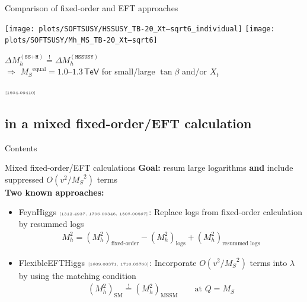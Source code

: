 \documentclass[hyperref={pdfpagelabels=false},ngerman]{beamer}
\newcommand{\eh}[1]{\,\mathsf{#1}}
\newcommand{\MS}{\ensuremath{M_S}}
\newcommand{\mycite}[1]{\ensuremath{\text{\textcolor{darkgray}{\tiny [#1]}}}}
\renewcommand{\emph}{\textbf}
\newcommand{\SM}{\ensuremath{\text{SM}}}
\newcommand{\MSSM}{\ensuremath{\text{MSSM}}}
\newcommand{\TeV}{\eh{TeV}}
\newcommand{\DMh}{\ensuremath{\Delta M_h^{(\texttt{SS+H})}}}
\newcommand{\DMhHSSUSY}{\ensuremath{\Delta M_h^{(\HSSUSY)}}}
\def\HSSUSY{\texttt{HSSUSY}}
\begin{document}
\begin{frame}{Comparison of fixed-order and EFT approaches}
  \begin{center}
    \texttt{[image: plots/SOFTSUSY/HSSUSY\_TB-20\_Xt--sqrt6\_individual]}\hfill
    \texttt{[image: plots/SOFTSUSY/Mh\_MS\_TB-20\_Xt--sqrt6]}
  \end{center}
  \begin{center}
    $\DMh \overset{!}{=} \DMhHSSUSY$\\[0.5em]
    $\Rightarrow$ $\MS^{\text{equal}} = 1.0$--$1.3\TeV$ for
    small/large $\tan\beta$ and/or $X_t$
  \end{center}
  \mycite{1804.09410}
\end{frame}


\subsection{in a mixed fixed-order/EFT calculation}

\begin{frame}{Contents}
\end{frame}

\begin{frame}{Mixed fixed-order/EFT calculations}
  \emph{Goal:} resum large logarithms \emph{and} include suppressed
  $O(v^2/\MS^2)$ terms
  \\[2em]
  \emph{Two known approaches:}
  \begin{itemize}
  \item FeynHiggs \mycite{1312.4937, 1706.00346, 1805.00867}: Replace logs from
    fixed-order calculation by resummed logs
    \begin{align*}
      M_h^2 = (M_h^2)_{\text{fixed-order}} - (M_h^2)_{\text{logs}} + (M_h^2)_{\text{resummed logs}}
    \end{align*}
  \item FlexibleEFTHiggs \mycite{1609.00371, 1710.03760}: Incorporate
    $O(v^2/\MS^2)$ terms into $\lambda$ by using the matching
    condition
    \begin{align*}
      (M_h^2)_{\SM} \overset{!}{=} (M_h^2)_{\MSSM} \qquad \text{at } Q = \MS
    \end{align*}
  \end{itemize}
\end{frame}
\end{document}
